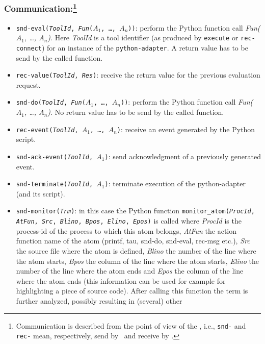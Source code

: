 \subsubsection{Communication:\protect\footnote{Communication is described from the point of view of the \TB, i.e., \texttt{snd-} and \texttt{rec-} mean, respectively, send by \TB\ and receive by \TB.}}

\begin{itemize}
\item \texttt{snd-eval(\emph{ToolId}, \emph{Fun}($A_1$, \ldots,
    $A_n$))}: perform the Python function call \emph{Fun($A_1$,
    \ldots, $A_n$)}. Here \emph{ToolId} is a tool identifier (as
  produced by \texttt{execute} or \texttt{rec-connect}) for an
  instance of the {\tt python-adapter}. A return value has to be send
  by the called function.
\item \texttt{rec-value(\emph{ToolId}, \emph{Res\/})}: receive the
  return value for the previous evaluation request.
\item \texttt{snd-do(\emph{ToolId}, \emph{Fun}($A_1$, \ldots, $A_n$))}:
  perform the Python function call \emph{Fun($A_1$, \ldots, $A_n$)}.
  No return value has to be send by the called function.
\item \texttt{rec-event(\emph{ToolId}, $A_1$, \ldots, $A_n$)}: receive an
  event generated by the Python script.
\item \texttt{snd-ack-event(\emph{ToolId}, $A_1$)}: send
  acknowledgment of a previously generated event.
\item \texttt{snd-terminate(\emph{ToolId}, $A_1$)}: terminate
  execution of the python-adapter (and its script). 
\item \texttt{snd-monitor(\emph{Trm})}: in this case the Python
  function \texttt{monitor\_atom(\emph{ProcId}, \emph{AtFun},
    \emph{Src}, \emph{Blino}, \emph{Bpos}, \emph{Elino}, \emph{Epos})}
  is called where \emph{ProcId} is the process-id of the process to
  which this atom belongs, \emph{AtFun} the action function name of
  the atom (printf, tau, snd-do, snd-eval, rec-msg etc.), \emph{Src}
  the source file where the atom is defined, \emph{Blino} the number
  of the line where the atom starts, \emph{Bpos} the column of the
  line where the atom starts, \emph{Elino} the number of the line
  where the atom ends and \emph{Epos} the column of the line where the
  atom ends (this information can be used for example for
  highlighting a piece of source code). After calling this function
  the term is further analyzed, possibly resulting in (several) other

\end{itemize}
